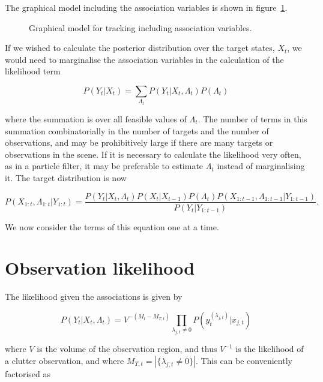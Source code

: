 The graphical model including the association variables is shown in figure~\ref{fig:HMMAssoc}.

\begin{figure}%

\caption{Graphical model for tracking including association variables.}%
\label{fig:HMMAssoc}%
\end{figure}

If we wished to calculate the posterior distribution over the target states, $X_t$, we would need to marginalise the association variables in the calculation of the likelihood term

\begin{equation}
P(Y_t|X_t) = \sum_{\Lambda_t} P(Y_t|X_t, \Lambda_t) P(\Lambda_t)
\label{eq:MarginaliseAssociations}
\end{equation}

where the summation is over all feasible values of $\Lambda_t$. The number of terms in this summation combinatorially in the number of targets and the number of observations, and may be prohibitively large if there are many targets or observations in the scene. If it is necessary to calculate the likelihood very often, as in a particle filter, it may be preferable to estimate $\Lambda_t$ instead of marginalising it. The target distribution is now

\begin{equation}
P(X_{1:t}, \Lambda_{1:t}|Y_{1:t}) = \frac{P(Y_t|X_t, \Lambda_t) P(X_t|X_{t-1}) P(\Lambda_t) P(X_{1:t-1}, \Lambda_{1:t-1}|Y_{1:t-1})}{P(Y_t|Y_{1:t-1})}.
\label{eq:MTPosterior}
\end{equation}

We now consider the terms of this equation one at a time.

\section{Observation likelihood}
The likelihood given the associations is given by

\begin{equation}
P(Y_t|X_t, \Lambda_t) = V^{-(M_t-M_{T,t})} \prod_{\lambda_{j,t} \ne 0} P(y_t^{(\lambda_{j,t})}|x_{j,t})
\label{eq:MTLikelihood}
\end{equation}

where $V$ is the volume of the observation region, and thus $V^{-1}$ is the likelihood of a clutter observation, and where $M_{T,t} = \left| \{ \lambda_{j,t} \ne 0 \} \right|$. This can be conveniently factorised as

